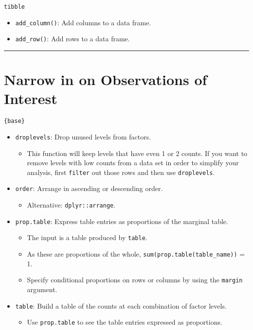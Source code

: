 \documentclass[
]{book}
\providecommand{\tightlist}{%
  \setlength{\itemsep}{0pt}\setlength{\parskip}{0pt}}
\begin{document}
\texttt{tibble}

\begin{itemize}
\tightlist
\item
  \texttt{add\_column()}: Add columns to a data frame.
\item
  \texttt{add\_row()}: Add rows to a data frame.
\end{itemize}

\begin{center}\rule{0.5\linewidth}{0.5pt}\end{center}

\hypertarget{narrow-in-on-observations-of-interest}{%
\section{Narrow in on Observations of Interest}\label{narrow-in-on-observations-of-interest}}

\texttt{\{base\}}

\begin{itemize}
\tightlist
\item
  \texttt{droplevels}: Drop unused levels from factors.

  \begin{itemize}
  \tightlist
  \item
    This function will keep levels that have even 1 or 2 counts. If you want to remove levels with low counts from a data set in order to simplify your analysis, first \texttt{filter} out those rows and then use \texttt{droplevels}.
  \end{itemize}
\item
  \texttt{order}: Arrange in ascending or descending order.

  \begin{itemize}
  \tightlist
  \item
    Alternative: \texttt{dplyr::arrange}.
  \end{itemize}
\item
  \texttt{prop.table}: Express table entries as proportions of the marginal table.

  \begin{itemize}
  \tightlist
  \item
    The input is a table produced by \texttt{table}.
  \item
    As these are proportions of the whole, \texttt{sum(prop.table(table\_name))} = 1.
  \item
    Specify conditional proportions on rows or columns by using the \texttt{margin} argument.
  \end{itemize}
\item
  \texttt{table}: Build a table of the counts at each combination of factor levels.

  \begin{itemize}
  \tightlist
  \item
    Use \texttt{prop.table} to see the table entries expressed as proportions.
  \end{itemize}
\end{itemize}
\end{document}
